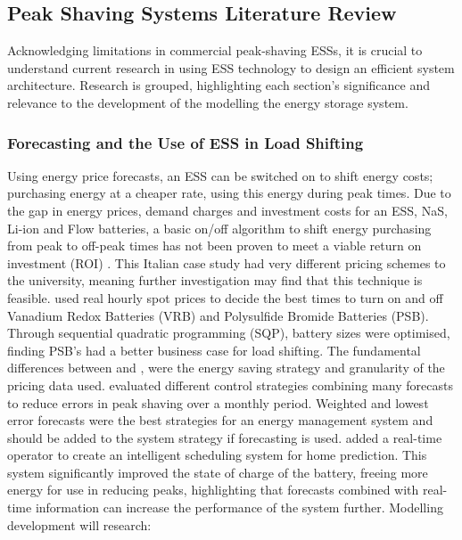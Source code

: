 \subsection{Peak Shaving Systems Literature
Review}\label{peak-shaving-systems-literature-review}

Acknowledging limitations in commercial peak-shaving ESSs, it is crucial
to understand current research in using ESS technology to design an
efficient system architecture. Research is grouped, highlighting each
section's significance and relevance to the development of the modelling
the energy storage system.

\subsubsection{Forecasting and the Use of ESS in Load
Shifting}\label{forecasting-and-the-use-of-ess-in-load-shifting}

Using energy price forecasts, an ESS can be switched on to shift energy
costs; purchasing energy at a cheaper rate, using this energy during
peak times. Due to the gap in energy prices, demand charges and
investment costs for an ESS, NaS, Li-ion and Flow batteries, a basic
on/off algorithm to shift energy purchasing from peak to off-peak times
has not been proven to meet a viable return on investment (ROI)
\cite{7555795}. This Italian case study had very different pricing
schemes to the university, meaning further investigation may find that
this technique is feasible. \cite{5590194} used real hourly spot prices
to decide the best times to turn on and off Vanadium Redox Batteries
(VRB) and Polysulfide Bromide Batteries (PSB). Through sequential
quadratic programming (SQP), battery sizes were optimised, finding PSB's
had a better business case for load shifting. The fundamental
differences between \cite{7555795} and \cite{5590194}, were the energy
saving strategy and granularity of the pricing data used. \cite{6938948}
evaluated different control strategies combining many forecasts to
reduce errors in peak shaving over a monthly period. Weighted and lowest
error forecasts were the best strategies for an energy management system
and should be added to the system strategy if forecasting is used.
\cite{Bennett2015122} added a real-time operator to create an
intelligent scheduling system for home prediction. This system
significantly improved the state of charge of the battery, freeing more
energy for use in reducing peaks, highlighting that forecasts combined
with real-time information can increase the performance of the system
further. Modelling development will research:

